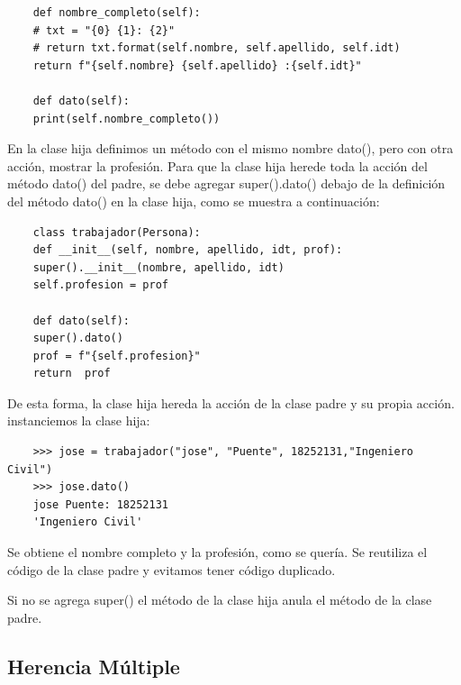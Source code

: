{\begin{lstlisting}
	def nombre_completo(self):
	# txt = "{0} {1}: {2}"
	# return txt.format(self.nombre, self.apellido, self.idt)
	return f"{self.nombre} {self.apellido} :{self.idt}"
	
	def dato(self):
	print(self.nombre_completo())
\end{lstlisting}



En la clase hija definimos un método con el mismo nombre {\ttfamily dato()}, pero con otra acción, mostrar la profesión. Para que la clase hija herede toda la acción del método {\ttfamily dato()} del padre, se debe agregar {\ttfamily super().dato()} debajo de la definición del método {\ttfamily dato()} en la clase hija, como se muestra a continuación:

\begin{lstlisting}
	class trabajador(Persona):
	def __init__(self, nombre, apellido, idt, prof):
	super().__init__(nombre, apellido, idt)
	self.profesion = prof
	
	def dato(self):
	super().dato()
	prof = f"{self.profesion}"
	return  prof
\end{lstlisting}

De esta forma, la clase hija hereda la acción de la clase padre y su propia acción. instanciemos la clase hija:
\begin{lstlisting}
	>>> jose = trabajador("jose", "Puente", 18252131,"Ingeniero Civil")
	>>> jose.dato()
	jose Puente: 18252131
	'Ingeniero Civil'
\end{lstlisting} 

Se obtiene el nombre completo y la profesión, como se quería. Se reutiliza el código de la clase padre y evitamos tener código duplicado. 

Si no se agrega {\ttfamily super()} el método de la clase hija anula el método de la clase padre.









\subsection{Herencia Múltiple}



}
